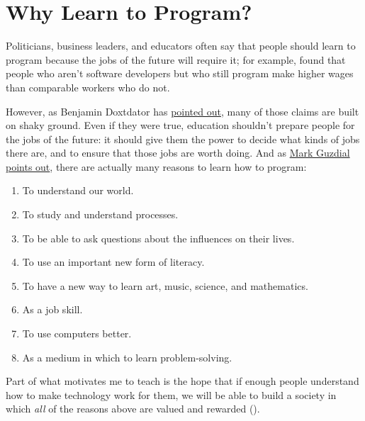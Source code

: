 \section{Why Learn to Program?}\label{s:intro-why}

Politicians, business leaders, and educators often say that people
should learn to program because the jobs of the future will require
it; for example, \cite{Scaf2017} found that people who aren't software
developers but who still program make higher wages than comparable
workers who do not.

However, as Benjamin Doxtdator has
\href{http://www.longviewoneducation.org/field-guide-jobs-dont-exist-yet/}{pointed
  out}, many of those claims are built on shaky ground.  Even if they
were true, education shouldn't prepare people for the jobs of the
future: it should give them the power to decide what kinds of jobs
there are, and to ensure that those jobs are worth doing.  And as
\href{https://computinged.wordpress.com/2017/10/18/why-should-we-teach-programming-hint-its-not-to-learn-problem-solving/}{Mark
  Guzdial points out}, there are actually many reasons to learn how to
program:

\begin{enumerate}

\item
  To understand our world.

\item
  To study and understand processes.

\item
  To be able to ask questions about the influences on their lives.

\item
  To use an important new form of literacy.

\item
  To have a new way to learn art, music, science, and mathematics.

\item
  As a job skill.

\item
  To use computers better.

\item
  As a medium in which to learn problem-solving.

\end{enumerate}

\noindent
Part of what motivates me to teach is the hope that if enough people
understand how to make technology work for them, we will be able to
build a society in which \emph{all} of the reasons above are valued
and rewarded ().

